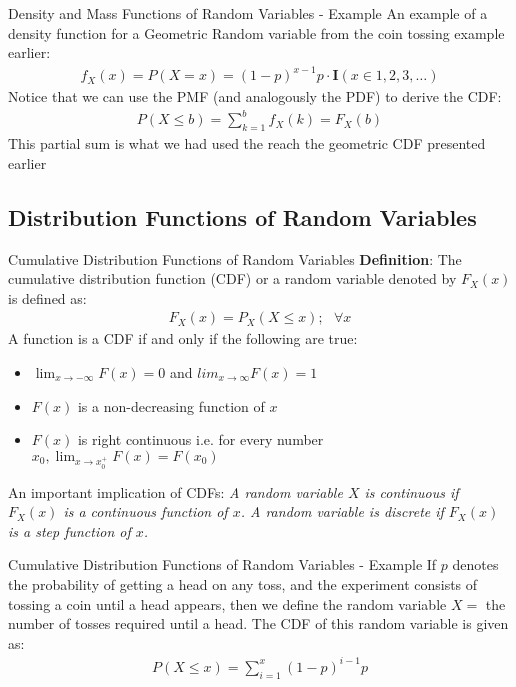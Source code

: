 \documentclass{beamer}
\begin{document}
\begin{frame}{Density and Mass Functions of Random Variables - Example}
An example of a density function for a Geometric Random variable from the coin tossing example earlier:
\begin{align*}
f_{X}(x) = P(X = x) = (1-p)^{x-1}p \cdot \textbf{I}(x\in{1,2,3,\ldots})
\end{align*}
Notice that we can use the PMF (and analogously the PDF) to derive the CDF:
\begin{align*}
P(X\leq b) = \sum_{k = 1}^{b}f_{X}(k) = F_{X}(b)
\end{align*}
This partial sum is what we had used the reach the geometric CDF presented earlier
\end{frame}

\subsection{Distribution Functions of Random Variables}
\begin{frame}{Cumulative Distribution Functions of Random Variables}
\textbf{Definition}:
The cumulative distribution function (CDF) or a random variable denoted by $F_{X}(x)$ is defined as:
\begin{align*}
F_{X}(x) = P_{X}(X \leq x);\>\>\> \forall x
\end{align*}
A function is a CDF if and only if the following are true:
\begin{itemize}
\item{$\lim_{x \rightarrow -\infty}F(x) = 0$ and $lim_{x \rightarrow \infty}F(x) = 1$}
\item{$F(x)$ is a non-decreasing function of $x$}
\item{$F(x)$ is right continuous i.e. for every number $x_{0}, \lim_{x\rightarrow x_{0}^{+}} F(x) = F(x_{0})$} 
\end{itemize}
An important implication of CDFs: \textit{A random variable $X$ is continuous if $F_{X}(x)$ is a continuous function of $x$. A random variable is discrete if $F_{X}(x)$ is a step function of $x$. }
\end{frame}

\begin{frame}{Cumulative Distribution Functions of Random Variables - Example}
If $p$ denotes the probability of getting a head on any toss, and the experiment consists of tossing a coin until a head appears, then we define the random variable $X = $ the number of tosses required until a head. The CDF of this random variable is given as:
\begin{align*}
P(X \leq x) = \sum_{i = 1}^{x} (1-p)^{i-1}p
\end{align*}
\end{frame}
\end{document}

